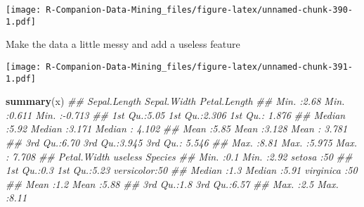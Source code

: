 \documentclass[
  notitlepage]{book}
\newenvironment{Shaded}{\begin{snugshade}}{\end{snugshade}}
\newcommand{\CommentTok}[1]{\textcolor[rgb]{0.56,0.35,0.01}{\textit{#1}}}
\newcommand{\DataTypeTok}[1]{\textcolor[rgb]{0.13,0.29,0.53}{#1}}
\newcommand{\DecValTok}[1]{\textcolor[rgb]{0.00,0.00,0.81}{#1}}
\newcommand{\KeywordTok}[1]{\textcolor[rgb]{0.13,0.29,0.53}{\textbf{#1}}}
\newcommand{\NormalTok}[1]{#1}
\newcommand{\OperatorTok}[1]{\textcolor[rgb]{0.81,0.36,0.00}{\textbf{#1}}}
\newcommand{\StringTok}[1]{\textcolor[rgb]{0.31,0.60,0.02}{#1}}
\begin{document}
\texttt{[image: R-Companion-Data-Mining\_files/figure-latex/unnamed-chunk-390-1.pdf]}

Make the data a little messy and add a useless feature

\begin{Shaded}
\end{Shaded}

\texttt{[image: R-Companion-Data-Mining\_files/figure-latex/unnamed-chunk-391-1.pdf]}

\begin{Shaded}
\begin{Highlighting}[]
\KeywordTok{summary}\NormalTok{(x)}
\CommentTok{\#\#   Sepal.Length   Sepal.Width     Petal.Length   }
\CommentTok{\#\#  Min.   :2.68   Min.   :0.611   Min.   :{-}0.713  }
\CommentTok{\#\#  1st Qu.:5.05   1st Qu.:2.306   1st Qu.: 1.876  }
\CommentTok{\#\#  Median :5.92   Median :3.171   Median : 4.102  }
\CommentTok{\#\#  Mean   :5.85   Mean   :3.128   Mean   : 3.781  }
\CommentTok{\#\#  3rd Qu.:6.70   3rd Qu.:3.945   3rd Qu.: 5.546  }
\CommentTok{\#\#  Max.   :8.81   Max.   :5.975   Max.   : 7.708  }
\CommentTok{\#\#   Petal.Width     useless           Species  }
\CommentTok{\#\#  Min.   :0.1   Min.   :2.92   setosa    :50  }
\CommentTok{\#\#  1st Qu.:0.3   1st Qu.:5.23   versicolor:50  }
\CommentTok{\#\#  Median :1.3   Median :5.91   virginica :50  }
\CommentTok{\#\#  Mean   :1.2   Mean   :5.88                  }
\CommentTok{\#\#  3rd Qu.:1.8   3rd Qu.:6.57                  }
\CommentTok{\#\#  Max.   :2.5   Max.   :8.11}
\end{Highlighting}
\end{Shaded}
\end{document}
